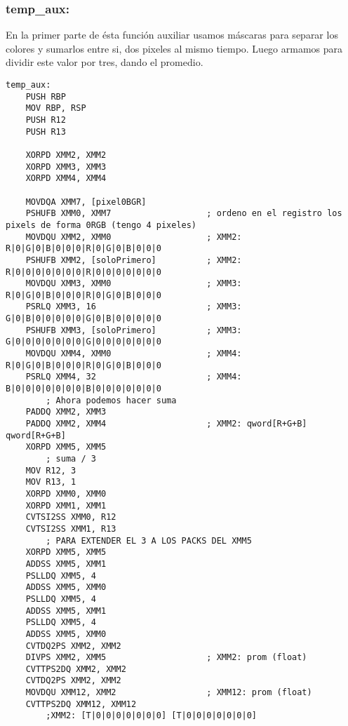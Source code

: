 \subsubsection{temp_aux:}

En la primer parte de \'esta funci\'on auxiliar usamos m\'ascaras para separar los colores y sumarlos entre si, dos pixeles al mismo tiempo.
Luego armamos para dividir este valor por tres, dando el promedio.
\begin{codesnippet}
\begin{verbatim}
temp_aux:
    PUSH RBP					
    MOV RBP, RSP
    PUSH R12
    PUSH R13
    
    XORPD XMM2, XMM2
    XORPD XMM3, XMM3
    XORPD XMM4, XMM4
    
    MOVDQA XMM7, [pixel0BGR]
    PSHUFB XMM0, XMM7		 			; ordeno en el registro los pixels de forma 0RGB (tengo 4 pixeles)
    MOVDQU XMM2, XMM0					; XMM2: R|0|G|0|B|0|0|0|R|0|G|0|B|0|0|0	
    PSHUFB XMM2, [soloPrimero]			; XMM2: R|0|0|0|0|0|0|0|R|0|0|0|0|0|0|0
    MOVDQU XMM3, XMM0					; XMM3: R|0|G|0|B|0|0|0|R|0|G|0|B|0|0|0 	
    PSRLQ XMM3, 16						; XMM3: G|0|B|0|0|0|0|0|G|0|B|0|0|0|0|0		
    PSHUFB XMM3, [soloPrimero]			; XMM3: G|0|0|0|0|0|0|0|G|0|0|0|0|0|0|0
    MOVDQU XMM4, XMM0					; XMM4: R|0|G|0|B|0|0|0|R|0|G|0|B|0|0|0 	
    PSRLQ XMM4, 32						; XMM4: B|0|0|0|0|0|0|0|B|0|0|0|0|0|0|0
        ; Ahora podemos hacer suma
    PADDQ XMM2, XMM3
    PADDQ XMM2, XMM4					; XMM2: qword[R+G+B] qword[R+G+B] 
    XORPD XMM5, XMM5
        ; suma / 3
    MOV R12, 3
    MOV R13, 1
    XORPD XMM0, XMM0
    XORPD XMM1, XMM1
    CVTSI2SS XMM0, R12
    CVTSI2SS XMM1, R13
        ; PARA EXTENDER EL 3 A LOS PACKS DEL XMM5
    XORPD XMM5, XMM5
    ADDSS XMM5, XMM1
    PSLLDQ XMM5, 4
    ADDSS XMM5, XMM0
    PSLLDQ XMM5, 4
    ADDSS XMM5, XMM1
    PSLLDQ XMM5, 4
    ADDSS XMM5, XMM0
    CVTDQ2PS XMM2, XMM2
    DIVPS XMM2, XMM5					; XMM2: prom (float)
    CVTTPS2DQ XMM2, XMM2
    CVTDQ2PS XMM2, XMM2
    MOVDQU XMM12, XMM2					; XMM12: prom (float)
    CVTTPS2DQ XMM12, XMM12
        ;XMM2: [T|0|0|0|0|0|0|0] [T|0|0|0|0|0|0|0]
\end{verbatim}
\end{codesnippet}

